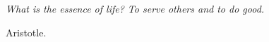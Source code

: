 \documentclass[a4paper, 11pt]{Thesis}  %
\begin{document}
 
 
 
 
 
 

\pagestyle{empty}  %

\null\vfill
\textit{What is the essence of life? To serve others and to do good.} 

\begin{flushright}
Aristotle.
\end{flushright}

\vfill\vfill\vfill\vfill\vfill\vfill\null
\clearpage  %
\end{document}
